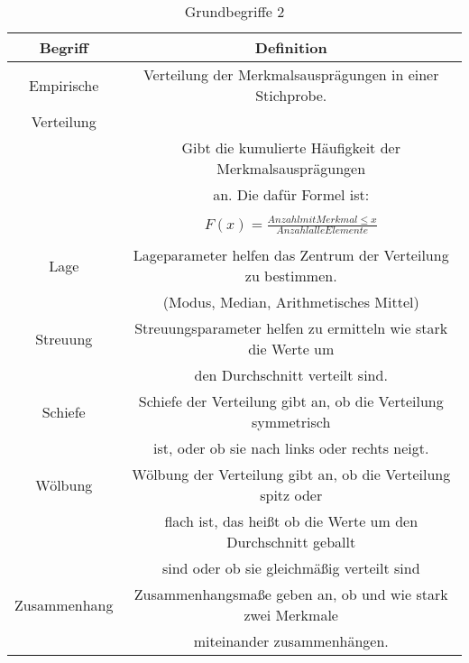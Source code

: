 \documentclass[12pt]{scrartcl}
\begin{document}
\begin{table}[h]
    \begin{tabular}{ | c | c | }
        \hline
        Begriff      & Definition                                                     \\
        \hline
        \hline
        Empirische   & Verteilung der Merkmalsausprägungen in einer Stichprobe.       \\
        Verteilung   &                                                                \\
                     & Gibt die kumulierte Häufigkeit der Merkmalsausprägungen        \\
                     & an. Die dafür Formel ist:                                      \\&\\
                     & $F(x) =\frac{Anzahl mit Merkmal \leq x}
        {Anzahl alle Elemente}$                                                       \\&\\
        \hline
        Lage         & Lageparameter helfen das Zentrum der Verteilung zu  bestimmen. \\
                     & (Modus, Median, Arithmetisches Mittel)                         \\
        \hline
        Streuung     & Streuungsparameter helfen zu ermitteln wie stark die Werte um  \\
                     & den Durchschnitt verteilt sind.                                \\
        \hline
        Schiefe      & Schiefe der Verteilung gibt an, ob die Verteilung symmetrisch  \\
                     & ist, oder ob sie nach links oder rechts neigt.                 \\
        \hline
        Wölbung      & Wölbung der Verteilung gibt an, ob die Verteilung spitz oder   \\
                     & flach ist, das heißt ob die Werte um den Durchschnitt geballt  \\
                     & sind oder ob sie gleichmäßig verteilt sind                     \\
        \hline
        Zusammenhang & Zusammenhangsmaße geben an, ob und wie stark zwei Merkmale     \\
                     & miteinander zusammenhängen.                                    \\
        \hline
    \end{tabular}
    \caption{Grundbegriffe 2}
\end{table}
\end{document}
